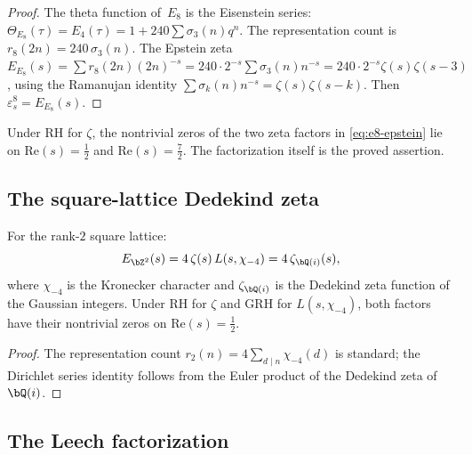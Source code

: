 \begin{proof}
The theta function of~$E_8$ is the Eisenstein series:
$\Theta_{E_8}(\tau)=E_4(\tau)=1+240\sum\sigma_3(n)q^n$. The
representation count is $r_8(2n)=240\,\sigma_3(n)$. The Epstein zeta
$E_{E_8}(s)=\sum r_8(2n)(2n)^{-s}=240\cdot
2^{-s}\sum\sigma_3(n)n^{-s}=240\cdot 2^{-s}\zeta(s)\zeta(s-3)$,
using the Ramanujan identity $\sum\sigma_k(n)n^{-s}=\zeta(s)\zeta(s-k)$.
Then $\varepsilon^8_s=E_{E_8}(s)$.
\end{proof}

\begin{remark}
\ClaimStatusProvedHere
Under RH for $\zeta$, the nontrivial zeros of the two zeta factors in
\eqref{eq:e8-epstein} lie on
$\mathrm{Re}(s)=\tfrac12$ and $\mathrm{Re}(s)=\tfrac72$. The
factorization itself is the proved assertion.
\end{remark}

\subsection{The square-lattice Dedekind zeta}

\begin{proposition}
\label{prop:z2-epstein}
\ClaimStatusProvedHere
For the rank-$2$ square lattice:
\begin{equation}\label{eq:z2-epstein}
 E_{\bZ^2}(s)
 = 4\,\zeta(s)\,L(s,\chi_{-4})
 = 4\,\zeta_{\bQ(i)}(s),
\end{equation}
where $\chi_{-4}$ is the Kronecker character and
$\zeta_{\bQ(i)}$ is the Dedekind zeta function of the Gaussian
integers. Under RH for $\zeta$ and GRH for
$L(s,\chi_{-4})$, both factors have their nontrivial zeros on
$\mathrm{Re}(s)=\tfrac12$.
\end{proposition}

\begin{proof}
The representation count $r_2(n)=4\sum_{d\mid n}\chi_{-4}(d)$ is
standard; the Dirichlet series identity follows from the Euler product
of the Dedekind zeta of~$\bQ(i)$.
\end{proof}

\subsection{The Leech factorization}

